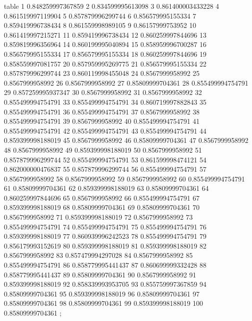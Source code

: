 table {%
	1 0.848259997367859
	2 0.834599995613098
	3 0.861400003433228
	4 0.861519997119904
	5 0.857879996299744
	6 0.856579995155334
	7 0.859419996738434
	8 0.861559998989105
	9 0.86157999753952
	10 0.861419997215271
	11 0.859419996738434
	12 0.860259997844696
	13 0.859819996356964
	14 0.860199995040894
	15 0.858959996700287
	16 0.856579995155334
	17 0.856579995155334
	18 0.860259997844696
	19 0.858559997081757
	20 0.857959995269775
	21 0.856579995155334
	22 0.857879996299744
	23 0.860119998455048
	24 0.8567999958992
	25 0.8567999958992
	26 0.8567999958992
	27 0.85809999704361
	28 0.855499994754791
	29 0.857259995937347
	30 0.8567999958992
	31 0.8567999958992
	32 0.855499994754791
	33 0.855499994754791
	34 0.860719997882843
	35 0.855499994754791
	36 0.855499994754791
	37 0.8567999958992
	38 0.855499994754791
	39 0.8567999958992
	40 0.855499994754791
	41 0.855499994754791
	42 0.855499994754791
	43 0.855499994754791
	44 0.859399998188019
	45 0.8567999958992
	46 0.85809999704361
	47 0.8567999958992
	48 0.8567999958992
	49 0.859399998188019
	50 0.8567999958992
	51 0.857879996299744
	52 0.855499994754791
	53 0.861599998474121
	54 0.862000000476837
	55 0.857879996299744
	56 0.855499994754791
	57 0.8567999958992
	58 0.8567999958992
	59 0.8567999958992
	60 0.855499994754791
	61 0.85809999704361
	62 0.859399998188019
	63 0.85809999704361
	64 0.860259997844696
	65 0.8567999958992
	66 0.855499994754791
	67 0.859399998188019
	68 0.85809999704361
	69 0.85809999704361
	70 0.8567999958992
	71 0.859399998188019
	72 0.8567999958992
	73 0.855499994754791
	74 0.855499994754791
	75 0.855499994754791
	76 0.859399998188019
	77 0.860939996242523
	78 0.855499994754791
	79 0.856179993152619
	80 0.859399998188019
	81 0.859399998188019
	82 0.8567999958992
	83 0.857479994297028
	84 0.8567999958992
	85 0.855499994754791
	86 0.858779995441437
	87 0.860699999332428
	88 0.858779995441437
	89 0.85809999704361
	90 0.8567999958992
	91 0.859399998188019
	92 0.858339993953705
	93 0.855759997367859
	94 0.85809999704361
	95 0.859399998188019
	96 0.85809999704361
	97 0.85809999704361
	98 0.85809999704361
	99 0.859399998188019
	100 0.85809999704361
};
